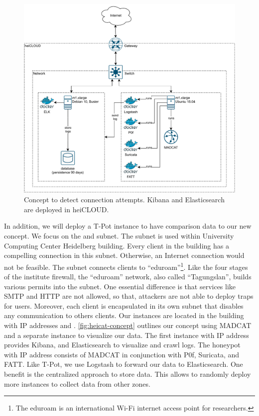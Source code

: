 \begin{figure}
    \centering
    \includegraphics[width=\textwidth]{figures/heicat-conecpt.pdf}
    \caption[Concept to detect connection attempts]{Concept to detect connection attempts. Kibana and Elasticsearch are deployed in heiCLOUD.}
    \label{fig:heicat-concept}
\end{figure}

In addition, we will deploy a T-Pot instance to have comparison data to our new concept.
We focus on the  and  subnet.
The  subnet is used within University Computing Center Heidelberg building.
Every client in the building has a compelling connection in this subnet.
Otherwise, an Internet connection would not be feasible.
The subnet  connects clients to \enquote{eduroam}\footnote{The eduroam is an international Wi-Fi internet access point for researchers.}.
Like the four stages of the institute firewall, the \enquote{eduroam} network, also called \enquote{Tagungslan}, builds various permits into the subnet.
One essential difference is that services like SMTP and HTTP are not allowed, so that, attackers are not able to deploy traps for users.
Moreover, each client is encapsulated in its own subnet that disables any communication to others clients.
Our instances are located in the building with IP addresses  and .
\autoref{fig:heicat-concept} outlines our concept using MADCAT and a separate instance to visualize our data.
The first instance with IP address  provides Kibana, and Elasticsearch to visualize and crawl logs.
The honeypot with IP address  consists of MADCAT in conjunction with P0f, Suricata, and FATT.
Like T-Pot, we use Logstash to forward our data to Elasticsearch.
One benefit is the centralized approach to store data.
This allows to randomly deploy more instances to collect data from other zones.

